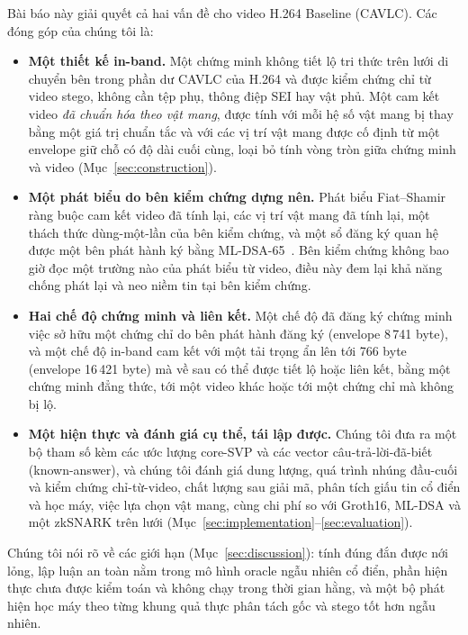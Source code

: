 \documentclass[journal]{IEEEtran}
\begin{document}
Bài báo này giải quyết cả hai vấn đề cho video H.264 Baseline (CAVLC). Các đóng
góp của chúng tôi là:
\begin{itemize}
\item \textbf{Một thiết kế in-band.} Một chứng minh không tiết lộ tri thức trên
  lưới di chuyển bên trong phần dư CAVLC của H.264 và được kiểm chứng chỉ từ
  video stego, không cần tệp phụ, thông điệp SEI hay vật phủ. Một cam kết video
  \emph{đã chuẩn hóa theo vật mang}, được tính với mỗi hệ số vật mang bị thay
  bằng một giá trị chuẩn tắc và với các vị trí vật mang được cố định từ một
  envelope giữ chỗ có độ dài cuối cùng, loại bỏ tính vòng tròn giữa chứng
  minh và video (Mục~\ref{sec:construction}).
\item \textbf{Một phát biểu do bên kiểm chứng dựng nên.} Phát biểu
  Fiat--Shamir ràng buộc cam kết video đã tính lại, các vị trí vật mang đã tính
  lại, một thách thức dùng-một-lần của bên kiểm chứng, và một sổ đăng ký quan hệ
  được một bên phát hành ký bằng ML-DSA-65~\cite{ref:fips204}. Bên kiểm chứng
  không bao giờ đọc một trường nào của phát biểu từ video, điều này đem lại khả
  năng chống phát lại và neo niềm tin tại bên kiểm chứng.
\item \textbf{Hai chế độ chứng minh và liên kết.} Một chế độ đã đăng ký chứng
  minh việc sở hữu một chứng chỉ do bên phát hành đăng ký (envelope 8\,741
  byte), và một chế độ in-band cam kết với một tải trọng ẩn lên tới 766 byte
  (envelope 16\,421 byte) mà về sau có thể được tiết lộ hoặc liên kết, bằng một
  chứng minh đẳng thức, tới một video khác hoặc tới một chứng chỉ mà không bị lộ.
\item \textbf{Một hiện thực và đánh giá cụ thể, tái lập được.} Chúng tôi đưa ra
  một bộ tham số kèm các ước lượng core-SVP và các vector câu-trả-lời-đã-biết
  (known-answer), và chúng tôi đánh giá dung lượng, quá trình nhúng đầu-cuối và
  kiểm chứng chỉ-từ-video, chất lượng sau giải mã, phân tích giấu tin cổ điển và
  học máy, việc lựa chọn vật mang, cùng chi phí so với Groth16, ML-DSA và một
  zkSNARK trên lưới (Mục~\ref{sec:implementation}--\ref{sec:evaluation}).
\end{itemize}
Chúng tôi nói rõ về các giới hạn (Mục~\ref{sec:discussion}): tính đúng đắn được
nới lỏng, lập luận an toàn nằm trong mô hình oracle ngẫu nhiên cổ điển, phần
hiện thực chưa được kiểm toán và không chạy trong thời gian hằng, và một bộ phát
hiện học máy theo từng khung quả thực phân tách gốc và stego tốt hơn ngẫu nhiên.

\end{document}
